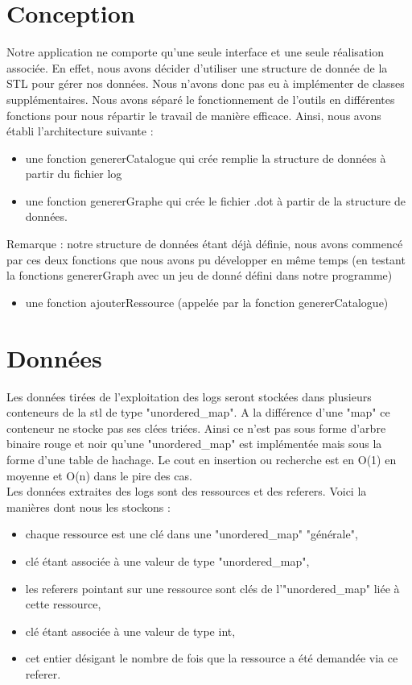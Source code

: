 \documentclass[a4paper]{article}
\begin{document}
\section{Conception}\noindent

	Notre application ne comporte qu'une seule interface et une seule réalisation associée. En effet, nous avons décider d'utiliser une structure de donnée de la STL pour gérer nos données. Nous n'avons donc pas eu à implémenter de classes supplémentaires. Nous avons séparé le fonctionnement de l'outils en différentes fonctions pour nous répartir le travail de manière efficace. Ainsi, nous avons établi l'architecture suivante :
	\begin{itemize}
		\item une fonction genererCatalogue qui crée remplie la structure de données à partir du fichier log
		\item une fonction genererGraphe qui crée le fichier .dot à partir de la structure de données. 
		\end{itemize}
		
	Remarque : notre structure de données étant déjà définie, nous avons commencé par ces deux fonctions que nous avons pu développer en même temps (en testant la fonctions genererGraph avec un jeu de donné défini dans notre programme)
	
	\begin{itemize}
	\item une fonction ajouterRessource (appelée par la fonction genererCatalogue) 
	\end{itemize}

\newpage
\section{Données}\noindent

Les données tirées de l'exploitation des logs seront stockées dans plusieurs conteneurs de la stl de type "unordered\_map". A la différence d'une "map" ce conteneur ne stocke pas ses clées triées. Ainsi ce n'est pas sous forme d'arbre binaire rouge et noir qu'une "unordered\_map" est implémentée mais sous la forme d'une table de hachage. Le cout en insertion ou recherche est en O(1) en moyenne et O(n) dans le pire des cas. 
\\
Les données extraites des logs sont des ressources et des referers. Voici la manières dont nous les stockons :
\begin{itemize}
\item chaque ressource est une clé dans une "unordered\_map" "générale",
\item clé étant associée à une valeur de type "unordered\_map",
\item les referers pointant sur une ressource sont clés de l'"unordered\_map" liée à cette ressource,
\item clé étant associée à une valeur de type int,
\item cet entier désigant le nombre de fois que la ressource a été demandée via ce referer.
\end{itemize}
\end{document}
